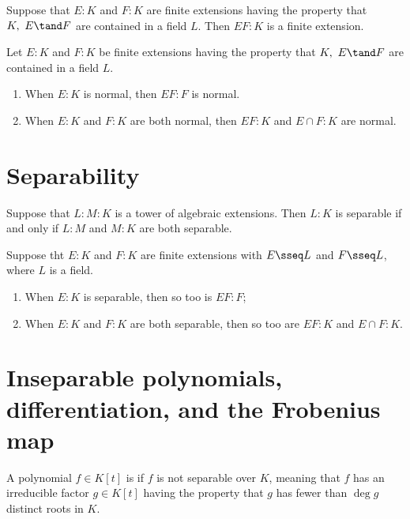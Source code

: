 \documentclass{article}
\begin{document}
\begin{tproposition}
  Suppose that $ E:K $ and $ F:K $ are finite extensions having the property that $ K,\ E\tand F $ are contained in a field $ L $.
  Then $ EF:K $ is a finite extension.
\end{tproposition}

\begin{ttheorem}
  Let $ E:K $ and $ F:K $ be finite extensions having the property that $ K,\ E\tand F $ are contained in a field $ L $. \begin{enumerate}[label=(\alph*)]
    \item When $ E:K $ is normal, then $ EF:F $ is normal.
    \item When $ E:K $ and $ F:K $ are both normal, then $ EF:K $ and $ E\cap F:K $ are normal.
  \end{enumerate}
\end{ttheorem}


\section{Separability} %
\setcounter{tdefinition}{24}

\begin{ttheorem}
  Suppose that $ L:M:K $ is a tower of algebraic extensions.
  Then $ L:K $ is separable if and only if $ L:M $ and $ M:K $ are both separable.
\end{ttheorem}

\begin{ttheorem}
  Suppose tht $ E:K $ and $ F:K $ are finite extensions with $ E\sseq L $ and $ F\sseq L $, where $ L $ is a field. \begin{enumerate}[label=(\alph*)]
    \item When $ E:K $ is separable, then so too is $ EF:F $;
    \item When $ E:K $ and $ F:K $ are both separable, then so too are $ EF:K $ and $ E\cap F:K $.
  \end{enumerate}
\end{ttheorem}

\section{Inseparable polynomials, differentiation, and the Frobenius map}
\begin{tdefinition}[Inseparable]
  A polynomial $f \in K[t]$ is  if $f$ is not separable over $K$, meaning that $f$ has an irreducible factor $g \in K[t]$ having the property that $g$ has fewer than $\deg g$ distinct roots in $K$.
\end{tdefinition}
\end{document}
